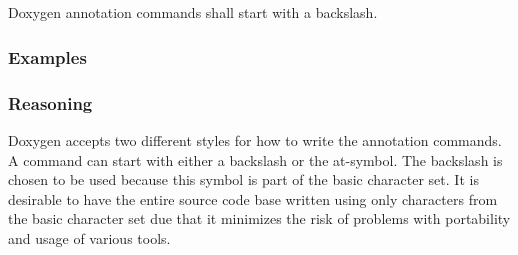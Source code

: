 \subsection*{\doxygenRule{}}

Doxygen annotation commands shall start with a backslash.

\subsubsection*{Examples}

\noindent
\begin{minipage}[t]{\codelstwidth\textwidth}
    
\end{minipage}\hfill
\begin{minipage}[t]{\codelstwidth\textwidth}
    
\end{minipage}


\subsubsection*{Reasoning}

Doxygen accepts two different styles for how to write the annotation commands. A command can start with either a backslash or the at-symbol.
The backslash is chosen to be used because this symbol is part of the basic character set. It is desirable to have the entire source code base written using only characters from the basic character set due that it minimizes the risk of problems with portability and usage of various tools.
